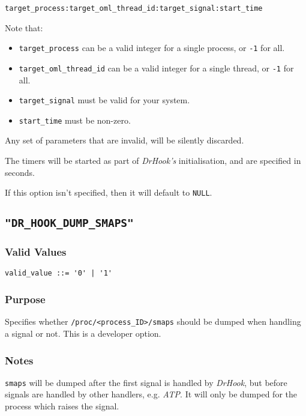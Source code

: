 \verb|target_process:target_oml_thread_id:target_signal:start_time|

Note that:
\begin{itemize}
    \item \verb|target_process| can be a valid integer for a single process, or \texttt{-1} for all.
    \item \verb|target_oml_thread_id| can be a valid integer for a single thread, or \texttt{-1} for all.
    \item \verb|target_signal| must be valid for your system.
    \item \verb|start_time| must be non-zero.
\end{itemize}
Any set of parameters that are invalid, will be silently discarded.

The timers will be started as part of \textit{DrHook's} initialisation, and are specified in seconds.

If this option isn't specified, then it will default to \verb|NULL|.



\subsection{\texttt{"DR\_HOOK\_DUMP\_SMAPS"}}
\label{section:flags:DR_HOOK_DUMP_SMAPS}
\vspace{-2ex}
\subsubsection{Valid Values}
\vspace{-2ex}
\verb+valid_value ::= '0' | '1'+ 

\vspace{-2ex}
\subsubsection{Purpose}
\vspace{-2ex}
Specifies whether \verb|/proc/<process_ID>/smaps| should be dumped when handling a signal or not. This is a developer option.

\vspace{-2ex}
\subsubsection{Notes}
\vspace{-2ex}
\texttt{smaps} will be dumped after the first signal is handled by \textit{DrHook}, but before signals are handled by other handlers, e.g. \textit{ATP}. It will only be dumped for the process which raises the signal.

